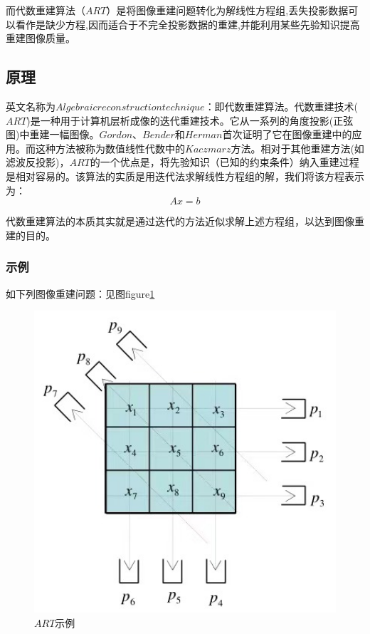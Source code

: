 \documentclass[hyperref]{ctexart}
\begin{document}
		而代数重建算法（$ART$）是将图像重建问题转化为解线性方程组,丢失投影数据可以看作是缺少方程,因而适合于不完全投影数据的重建,并能利用某些先验知识提高重建图像质量。

		\subsection{原理}
			英文名称为$Algebraic reconstruction technique$：即代数重建算法。代数重建技术($ART$)是一种用于计算机层析成像的迭代重建技术。它从一系列的角度投影(正弦图)中重建一幅图像。$Gordon$、$Bender$和$Herman$首次证明了它在图像重建中的应用。而这种方法被称为数值线性代数中的$Kaczmarz$方法。相对于其他重建方法(如滤波反投影)，$ART$的一个优点是，将先验知识（已知的约束条件）纳入重建过程是相对容易的。该算法的实质是用迭代法求解线性方程组的解，我们将该方程表示为：
			\begin{equation}
				Ax=b
			\end{equation}

			代数重建算法的本质其实就是通过迭代的方法近似求解上述方程组，以达到图像重建的目的。
			\subsubsection{示例}
			如下列图像重建问题：见图figure\ref{ART示例}
			\begin{figure}[ht!]
				\centering
				\includegraphics[width=120mm]{ART示例.jpg}
				\caption{$ART$示例 \label{ART示例}}
			\end{figure}
\end{document}
